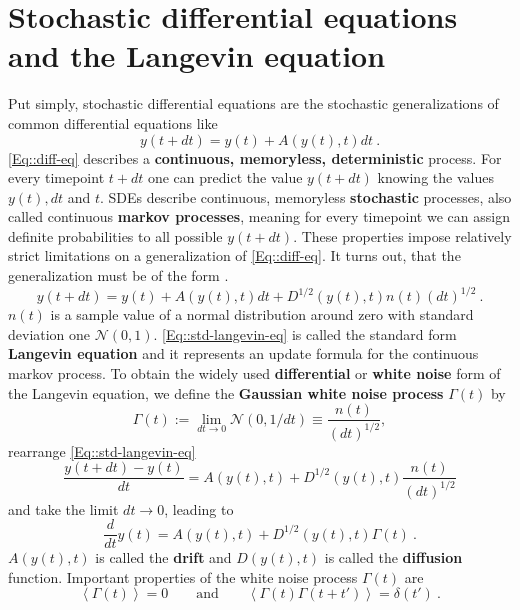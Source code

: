 	\section{Stochastic differential equations and the Langevin equation}
		Put simply, stochastic differential equations are the stochastic generalizations of common differential equations like
		\begin{equation} \label{Eq::diff-eq}
			y(t + dt) =	y(t) + A(y(t), t) dt ~.
		\end{equation}
		\autoref{Eq::diff-eq} describes a \textbf{continuous, memoryless, deterministic} process. For every timepoint $t + dt$ one can predict the value $y(t+dt)$ knowing the values $y(t), dt $ and $t$. SDEs describe continuous, memoryless \textbf{stochastic} processes, also called continuous \textbf{markov processes}, meaning for every timepoint we can assign definite probabilities to all possible $y(t + dt)$. These properties impose relatively strict limitations on a generalization of \autoref{Eq::diff-eq}. It turns out, that the generalization must be of the form \cite{gillespie1996mathematics}.
		\begin{equation} \label{Eq::std-langevin-eq}
			y(t + dt) =	y(t) + A(y(t), t) dt + D^{1/2} \left(y(t), t\right) n(t) (dt)^{1/2}~.
		\end{equation}
	 	$n(t)$ is a sample value of a normal distribution around zero with standard deviation one $\mathcal{N}(0,1)$. \autoref{Eq::std-langevin-eq} is called the standard form \textbf{Langevin equation} and it represents an update formula for the continuous markov process. To obtain the widely used \textbf{differential }or \textbf{white noise }form of the Langevin equation, we define the \textbf{Gaussian white noise process} $\Gamma(t)$ by
	 	\begin{equation}
	 		\Gamma(t) :=	\lim\limits_{dt \rightarrow 0} \mathcal{N}(0, 1/dt) \equiv \frac{n(t)}{(dt)^{1/2}},
	 	\end{equation}
 		rearrange \autoref{Eq::std-langevin-eq}
 		\begin{equation}
 			\frac{y(t + dt) - y(t)}{dt} =	A(y(t), t) + D^{1/2} (y(t), t) \frac{n(t)}{(dt)^{1/2}}
 		\end{equation}
 		and take the limit $dt \rightarrow 0$, leading to
 		\begin{equation} \label{Eq::Differential-Langevin-eq}
 			\frac{d}{dt} y(t) =	A(y(t), t) + D^{1/2}(y(t), t) \Gamma(t)~.
 		\end{equation}
 		$A(y(t), t)$ is called the \textbf{drift} and $D(y(t), t)$ is called the \textbf{diffusion} function. Important properties of the white noise process $\Gamma(t)$ are
 		\begin{equation}
 			\left \langle \Gamma(t) \right \rangle = 0 \qquad \text{and} \qquad  			\left \langle \Gamma(t) \Gamma(t + t')\right \rangle =	\delta(t') ~.
 		\end{equation} 
 		
